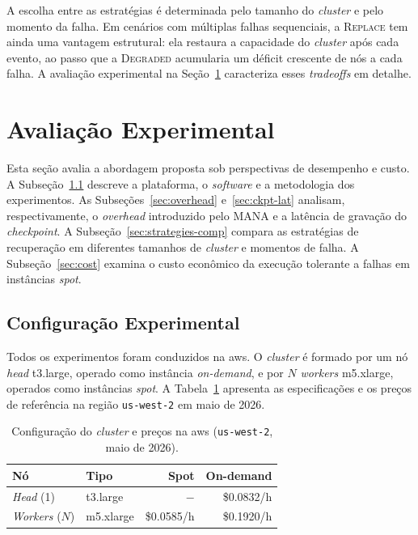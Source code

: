 \documentclass[a4paper,11pt]{article}
\begin{document}
            A escolha entre as estratégias é determinada pelo tamanho do
            \textit{cluster} e pelo momento da falha. Em cenários com múltiplas
            falhas sequenciais, a \textsc{Replace} tem ainda uma vantagem estrutural:
            ela restaura a capacidade do \textit{cluster} após cada evento, ao passo
            que a \textsc{Degraded} acumularia um déficit crescente de nós a cada
            falha. A avaliação experimental na Seção~\ref{sec:avaliacao} caracteriza
            esses \textit{tradeoffs} em detalhe.

    \section{Avaliação Experimental}
    \label{sec:avaliacao}

        Esta seção avalia a abordagem proposta sob perspectivas de desempenho e custo.
        A Subseção~\ref{sec:config} descreve a plataforma, o \textit{software} e a
        metodologia dos experimentos. As Subseções~\ref{sec:overhead}
        e~\ref{sec:ckpt-lat} analisam, respectivamente, o \textit{overhead} introduzido
        pelo MANA e a latência de gravação do \textit{checkpoint}. A
        Subseção~\ref{sec:strategies-comp} compara as estratégias de recuperação em
        diferentes tamanhos de \textit{cluster} e momentos de falha. A
        Subseção~\ref{sec:cost} examina o custo econômico da execução tolerante a
        falhas em instâncias \textit{spot}.

        \subsection{Configuração Experimental}
        \label{sec:config}

            Todos os experimentos foram conduzidos na \gls{aws}. O \textit{cluster} é
            formado por um nó \textit{head} t3.large, operado como instância
            \textit{on-demand}, e por $N$ \textit{workers} m5.xlarge, operados como
            instâncias \textit{spot}. A Tabela~\ref{tab:hardware} apresenta as
            especificações e os preços de referência na região \texttt{us-west-2}
            em maio de 2026.

            \begin{table}[htb]
                \caption{Configuração do \textit{cluster} e preços na \gls{aws}
                         (\texttt{us-west-2}, maio de 2026).}
                \label{tab:hardware}
                \centering
                \small
                \begin{tabular}{llrr}
                    \toprule
                    \textbf{Nó}            & \textbf{Tipo}  & \textbf{Spot}  & \textbf{On-demand} \\
                    \midrule
                    \textit{Head} (1)      & t3.large       & $-$            & \$0.0832/h \\
                    \textit{Workers} ($N$) & m5.xlarge      & \$0.0585/h     & \$0.1920/h \\
                    \bottomrule
                \end{tabular}
            \end{table}
\end{document}
